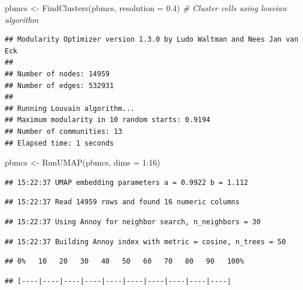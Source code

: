 \documentclass[
]{article}
\newenvironment{Shaded}{\begin{snugshade}}{\end{snugshade}}
\newcommand{\AttributeTok}[1]{\textcolor[rgb]{0.77,0.63,0.00}{#1}}
\newcommand{\CommentTok}[1]{\textcolor[rgb]{0.56,0.35,0.01}{\textit{#1}}}
\newcommand{\DecValTok}[1]{\textcolor[rgb]{0.00,0.00,0.81}{#1}}
\newcommand{\FloatTok}[1]{\textcolor[rgb]{0.00,0.00,0.81}{#1}}
\newcommand{\FunctionTok}[1]{\textcolor[rgb]{0.00,0.00,0.00}{#1}}
\newcommand{\NormalTok}[1]{#1}
\newcommand{\OtherTok}[1]{\textcolor[rgb]{0.56,0.35,0.01}{#1}}
\newcommand{\SpecialCharTok}[1]{\textcolor[rgb]{0.00,0.00,0.00}{#1}}
\begin{document}
\begin{Shaded}
\begin{Highlighting}[]
\NormalTok{pbmcs }\OtherTok{\textless{}{-}} \FunctionTok{FindClusters}\NormalTok{(pbmcs, }\AttributeTok{resolution =} \FloatTok{0.4}\NormalTok{) }\CommentTok{\# Cluster cells using louvian algorithm }
\end{Highlighting}
\end{Shaded}

\begin{verbatim}
## Modularity Optimizer version 1.3.0 by Ludo Waltman and Nees Jan van Eck
## 
## Number of nodes: 14959
## Number of edges: 532931
## 
## Running Louvain algorithm...
## Maximum modularity in 10 random starts: 0.9194
## Number of communities: 13
## Elapsed time: 1 seconds
\end{verbatim}

\begin{Shaded}
\begin{Highlighting}[]
\NormalTok{pbmcs }\OtherTok{\textless{}{-}} \FunctionTok{RunUMAP}\NormalTok{(pbmcs, }\AttributeTok{dims =} \DecValTok{1}\SpecialCharTok{:}\DecValTok{16}\NormalTok{)}
\end{Highlighting}
\end{Shaded}

\begin{verbatim}
## 15:22:37 UMAP embedding parameters a = 0.9922 b = 1.112
\end{verbatim}

\begin{verbatim}
## 15:22:37 Read 14959 rows and found 16 numeric columns
\end{verbatim}

\begin{verbatim}
## 15:22:37 Using Annoy for neighbor search, n_neighbors = 30
\end{verbatim}

\begin{verbatim}
## 15:22:37 Building Annoy index with metric = cosine, n_trees = 50
\end{verbatim}

\begin{verbatim}
## 0%   10   20   30   40   50   60   70   80   90   100%
\end{verbatim}

\begin{verbatim}
## [----|----|----|----|----|----|----|----|----|----|
\end{verbatim}
\end{document}
